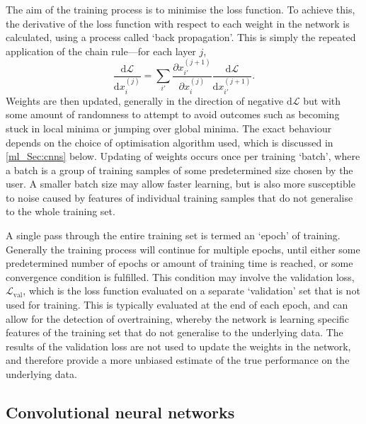 The aim of the training process is to minimise the loss function. To achieve this, the derivative of the loss function with respect to each weight in the network is calculated, using a process called `back propagation'. This is simply the repeated application of the chain rule---for each layer $j$,
\begin{equation}
\frac{\text{d}\mathcal{L}}{\text{d}x_i^{(j)}}
= \sum_{i'}
\frac{\partial x_{i'}^{(j + 1)}}{\partial x_i^{(j)}}
\frac{\text{d}\mathcal{L}}{\text{d}x_{i'}^{(j + 1)}}.
\end{equation}
Weights are then updated, generally in the direction of negative $\text{d}\mathcal{L}$ but with some amount of randomness to attempt to avoid outcomes such as becoming stuck in local minima or jumping over global minima. The exact behaviour depends on the choice of optimisation algorithm used, which is discussed in \autoref{ml_Sec:cnns} below. Updating of weights occurs once per training `batch', where a batch is a group of training samples of some predetermined size chosen by the user. A smaller batch size may allow faster learning, but is also more susceptible to noise caused by features of individual training samples that do not generalise to the whole training set.

A single pass through the entire training set is termed an `epoch' of training. Generally the training process will continue for multiple epochs, until either some predetermined number of epochs or amount of training time is reached, or some convergence condition is fulfilled. This condition may involve the validation loss, $\mathcal{L}_\text{val}$, which is the loss function evaluated on a separate `validation' set that is not used for training. This is typically evaluated at the end of each epoch, and can allow for the detection of overtraining, whereby the network is learning specific features of the training set that do not generalise to the underlying data. The results of the validation loss are not used to update the weights in the network, and therefore provide a more unbiased estimate of the true performance on the underlying data.

\subsection{Convolutional neural networks}
\label{ml_Sec:cnns}

